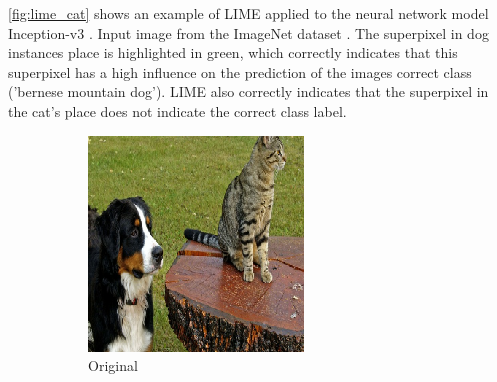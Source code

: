 \autoref{fig:lime_cat} shows an example of LIME applied to the neural network model Inception-v3 \cite{szegedy2016rethinking}. Input image from the ImageNet dataset \cite{ILSVRC15}. The superpixel in dog instances place is highlighted in green, which correctly indicates that this superpixel has a high influence on the prediction of the images correct class ('bernese mountain dog'). LIME also correctly indicates that the superpixel in the cat's place does not indicate the correct class label.

\begin{figure}[ht]
  \centering
  \begin{subfigure}{0.32\linewidth}
    \includegraphics[width=\linewidth]{figures/lime_orig.png}
    \caption{Original}
    \label{fig:bird-a}
  \end{subfigure}
  \begin{subfigure}{0.32\linewidth}

\end{subfigure}
\end{figure}
